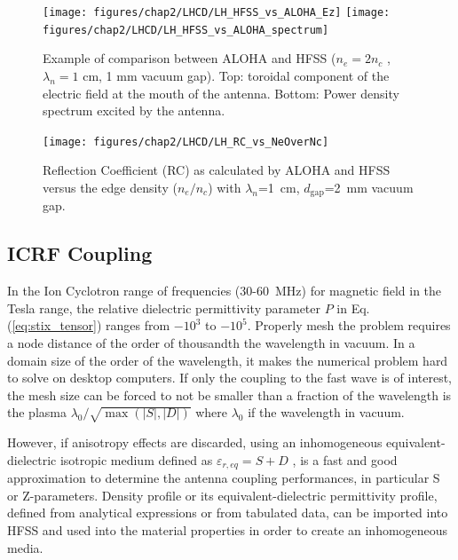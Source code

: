 \begin{figure}[h]
	\centering
	\texttt{[image: figures/chap2/LHCD/LH\_HFSS\_vs\_ALOHA\_Ez]}
	\texttt{[image: figures/chap2/LHCD/LH\_HFSS\_vs\_ALOHA\_spectrum]}
	\caption{Example of comparison between ALOHA and HFSS ($n_e = 2n_c$ , $\lambda_n=1$ cm, 1 mm vacuum gap).  Top: toroidal component of the electric field at the mouth of the antenna. Bottom: Power density spectrum excited by the antenna.}
	\label{fig:LH_fied_spectrum}
\end{figure}

\begin{figure}[h]
	\centering
	\texttt{[image: figures/chap2/LHCD/LH\_RC\_vs\_NeOverNc]}
	\caption{Reflection Coefficient (RC) as calculated by ALOHA and HFSS versus the edge density   ($n_e/n_c$) with  $\lambda_n$=1~cm, $d_\mathrm{gap}$=2~mm vacuum gap.}
	\label{fig:LH_RC_vs_NeOverNc}
\end{figure}


\clearpage
\subsection{ICRF Coupling}
In the Ion Cyclotron range of frequencies (30-60~MHz) for magnetic field in the Tesla range, the relative dielectric permittivity parameter $P$ in Eq.(\ref{eq:stix_tensor}) ranges from $-10^3$ to $-10^5$. Properly mesh the problem requires a node distance of the order of thousandth the wavelength in vacuum. In a domain size of the order of the wavelength, it makes the numerical problem hard to solve on desktop computers. If only the coupling to the fast wave is of interest, the mesh size can be forced to not be smaller than a fraction of the wavelength is the plasma $\lambda_0/\sqrt{\max(|S|, |D|)}$ where $\lambda_0$ if the  wavelength in vacuum. 

However, if anisotropy effects are discarded, using an inhomogeneous equivalent-dielectric isotropic medium  defined as $\varepsilon_{r,eq}=S+D$ , is a fast and good approximation to determine the antenna coupling performances, in particular S or Z-parameters. Density profile or its equivalent-dielectric permittivity profile, defined from analytical expressions or from tabulated data, can be imported into HFSS  and used into the material properties in order to create an inhomogeneous media. 


